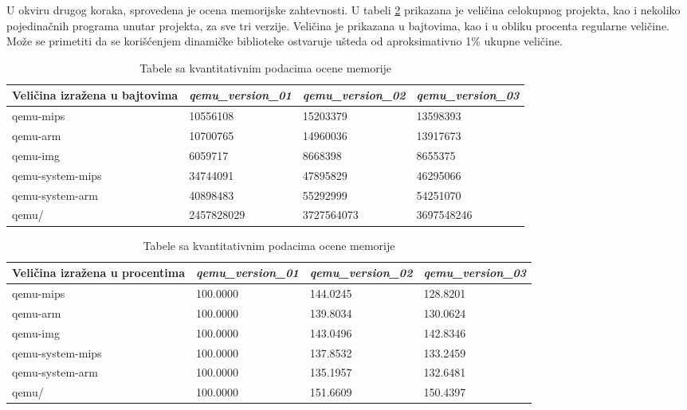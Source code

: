\documentclass[12pt,oneside]{memoir}
\newcommand{\strano}[1]{\textit{#1}}
\begin{document}
U okviru drugog koraka, sprovedena je ocena memorijske zahtevnosti. U tabeli \ref{tabela} prikazana je veličina celokupnog projekta, kao i nekoliko pojedinačnih programa unutar projekta, za sve tri verzije. Veličina je prikazana u bajtovima, kao i u obliku procenta regularne veličine. Može se primetiti da se korišćenjem dinamičke biblioteke ostvaruje ušteda od aproksimativno 1\% ukupne veličine.

\begin{table}
\caption{Tabele sa kvantitativnim podacima ocene memorije}
\label{tabela}
\begin{tabular}{ |p{3.35cm}|p{3.2cm}|p{3.2cm}|p{3.2cm}|}
 \hline
 Veličina izražena u bajtovima & \strano{qemu\_version\_01} & \strano{qemu\_version\_02}	& \strano{qemu\_version\_03} \\
 \hline
 qemu-mips & 10556108 & 15203379  & 13598393 \\
 \hline
 qemu-arm & 10700765 & 14960036 & 13917673 \\
 \hline
 qemu-img& 6059717 & 8668398 & 8655375 \\
 \hline
  qemu-system-mips & 34744091 & 47895829 & 46295066 \\
 \hline
  qemu-system-arm & 40898483 & 55292999 & 54251070 \\
 \hline
  qemu/ & 2457828029 & 3727564073 & 3697548246 \\
 \hline
\end{tabular}

\vspace{1em}

\begin{tabular}{ |p{3.35cm}|p{3.2cm}|p{3.2cm}|p{3.2cm}|}
 \hline
 Veličina izražena u procentima & \strano{qemu\_version\_01} & \strano{qemu\_version\_02}	& \strano{qemu\_version\_03} \\
 \hline
 qemu-mips & 100.0000 & 144.0245 & 128.8201 \\
 \hline
 qemu-arm & 100.0000 & 139.8034 & 130.0624 \\
 \hline
qemu-img & 100.0000 & 143.0496 & 142.8346 \\
 \hline
  qemu-system-mips & 100.0000 & 137.8532 & 133.2459 \\
 \hline
  qemu-system-arm & 100.0000 & 135.1957 & 132.6481 \\
 \hline
  qemu/ & 100.0000 & 151.6609 & 150.4397 \\
 \hline
\end{tabular}

\end{table}
\end{document}

